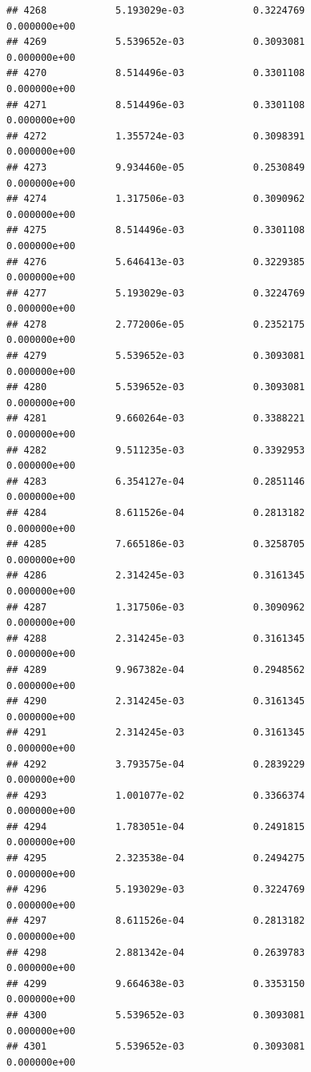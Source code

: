 \documentclass[
]{article}
\begin{document}
\begin{verbatim}
## 4268            5.193029e-03            0.3224769            0.000000e+00
## 4269            5.539652e-03            0.3093081            0.000000e+00
## 4270            8.514496e-03            0.3301108            0.000000e+00
## 4271            8.514496e-03            0.3301108            0.000000e+00
## 4272            1.355724e-03            0.3098391            0.000000e+00
## 4273            9.934460e-05            0.2530849            0.000000e+00
## 4274            1.317506e-03            0.3090962            0.000000e+00
## 4275            8.514496e-03            0.3301108            0.000000e+00
## 4276            5.646413e-03            0.3229385            0.000000e+00
## 4277            5.193029e-03            0.3224769            0.000000e+00
## 4278            2.772006e-05            0.2352175            0.000000e+00
## 4279            5.539652e-03            0.3093081            0.000000e+00
## 4280            5.539652e-03            0.3093081            0.000000e+00
## 4281            9.660264e-03            0.3388221            0.000000e+00
## 4282            9.511235e-03            0.3392953            0.000000e+00
## 4283            6.354127e-04            0.2851146            0.000000e+00
## 4284            8.611526e-04            0.2813182            0.000000e+00
## 4285            7.665186e-03            0.3258705            0.000000e+00
## 4286            2.314245e-03            0.3161345            0.000000e+00
## 4287            1.317506e-03            0.3090962            0.000000e+00
## 4288            2.314245e-03            0.3161345            0.000000e+00
## 4289            9.967382e-04            0.2948562            0.000000e+00
## 4290            2.314245e-03            0.3161345            0.000000e+00
## 4291            2.314245e-03            0.3161345            0.000000e+00
## 4292            3.793575e-04            0.2839229            0.000000e+00
## 4293            1.001077e-02            0.3366374            0.000000e+00
## 4294            1.783051e-04            0.2491815            0.000000e+00
## 4295            2.323538e-04            0.2494275            0.000000e+00
## 4296            5.193029e-03            0.3224769            0.000000e+00
## 4297            8.611526e-04            0.2813182            0.000000e+00
## 4298            2.881342e-04            0.2639783            0.000000e+00
## 4299            9.664638e-03            0.3353150            0.000000e+00
## 4300            5.539652e-03            0.3093081            0.000000e+00
## 4301            5.539652e-03            0.3093081            0.000000e+00

\end{verbatim}
\end{document}
